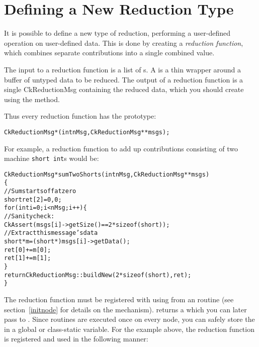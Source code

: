 \section{Defining a New Reduction Type}

\label{new_type_reduction}

It is possible to define a new type of reduction, performing a 
user-defined operation on user-defined data.  This is done by 
creating a {\em reduction function}, which 
combines separate contributions 
into a single combined value.

The input to a reduction function is a list of s.
A  is a thin wrapper around a buffer of untyped data
to be reduced.  
The output of a reduction function is a single CkReductionMsg
containing the reduced data, which you should create using the
 method.  

Thus every reduction function has the prototype:
\begin{alltt}
CkReductionMsg *(int nMsg,CkReductionMsg **msgs);
\end{alltt}

For example, a reduction function to add up contributions 
consisting of two machine {\tt short int}s would be:

\begin{alltt}
CkReductionMsg *sumTwoShorts(int nMsg,CkReductionMsg **msgs)
\{
  //Sum starts off at zero
  short ret[2]={0,0};
  for (int i=0;i<nMsg;i++) \{
    //Sanity check:
    CkAssert(msgs[i]->getSize()==2*sizeof(short));
    //Extract this message's data
    short *m=(short *)msgs[i]->getData();
    ret[0]+=m[0];
    ret[1]+=m[1];
  \}
  return CkReductionMsg::buildNew(2*sizeof(short),ret);
\}
\end{alltt}

The reduction function must be registered with \charmpp{} 
using  from
an  routine (see section~\ref{initnode} for details
on the  mechanism).   
returns a  which you can later 
pass to .  Since  routines are executed
once on every node, you can safely store the 
in a global or class-static variable.  For the example above, the reduction
function is registered and used in the following manner:

